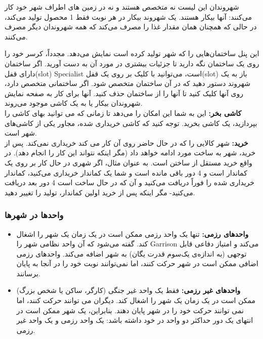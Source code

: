 \documentclass[]{article}
\begin{document}
شهروندان این لیست نه متخصص هستند و نه در زمین های اطراف شهر خود کار می‌کنند: آنها بیکار هستند. یک شهروند بیکار در هر نوبت فقط 1 محصول تولید می‌کند، در حالی که همچنان همان مقدار غذا را مصرف می‌کند که همه شهروندان دیگر مصرف می‌کنند.

این پنل ساختمان‌هایی را که شهر تولید کرده است نمایش می‌دهد. مجدداً، کرسر خود را روی یک ساختمان نگه دارید تا جزئیات بیشتری در مورد آن به دست آورید. اگر ساختمان دارای قفل(slot) Specialist است، می‌توانید با کلیک بر روی یک قفل(slot)  باز به یک شهروند دستور دهید که در آن ساختمان متخصص شود. اگر ساختمانی متخصص دارد، روی آنها کلیک کنید تا آنها را از ساختمان حذف کنید. آنها برای کار به صفحه نمایش شهروندان بیکار یا به یک کاشی موجود می‌روند.
\\\noindent \textbf{کاشی بخر:}
این به شما این امکان را می‌دهد تا زمانی که می توانید بهای کاشی را بپردازید، یک کاشی بخرید. توجه کنید که کاشی خریداری شده، مجاور یکی از کاشی‌های شهر است.
\\\noindent \textbf{خرید:}
شهر کالایی را که در حال حاضر روی آن کار می کند خریداری نمی‌کند. پس از خرید، شهر به ساخت مورد ادامه خواهد داد (مگر اینکه نتواند این کار را انجام دهد).  در واقع خرید مستقل از ساختن است. به عنوان مثال، اگر شهری در حال کار بر روی یک کماندار است و 4 دور باقی مانده است و شما یک کماندار خریداری می‌کنید، کماندار خریداری شده را فوراً دریافت می‌کنید و آن که در حال ساخت است 4 دور بعد دریافت می‌کنید- مگر اینکه پس از خرید اولین کماندار، تولید را تغییر دهید.

\subsubsection*{{\titr واحدها در شهرها}}
\begin{itemize}
	\item \textbf{واحدهای رزمی:} تنها یک واحد رزمی ممکن است در یک زمان یک شهر را اشغال کند. گفته می‌شود که آن واحد نظامی شهر را Garrison می‌کند و امتیاز دفاعی قابل توجهی (به اندازه‌ی یک‌سوم قدرت یگان) به شهر اضافه می‌کند. واحدهای رزمی اضافی ممکن است در شهر حرکت کنند، اما نمی‌توانند نوبت خود را در آنجا به پایان برسانند.
	\item \textbf{واحدهای غیر رزمی:} فقط یک واحد غیر جنگی (کارگر، ساکن یا شخص بزرگ) ممکن است در یک زمان یک شهر را اشغال کند. دیگران می توانند حرکت کنند، اما نمی توانند حرکت خود را در شهر پایان دهند. بنابراین، یک شهر ممکن است در انتهای یک دور حداکثر دو واحد در خود داشته باشد: یک واحد رزمی و یک واحد غیر رزمی.
\end{itemize}
\end{document}
